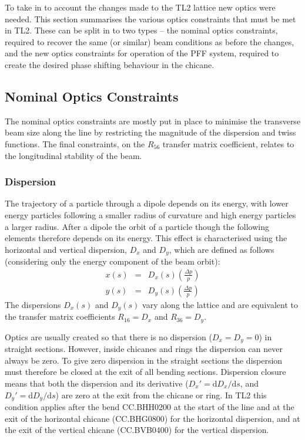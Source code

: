 To take in to account the changes made to the TL2 lattice new optics were needed. This section summarises the various optics constraints that must be met in TL2. These can be split in to two types -- the nominal optics constraints, required to recover the same (or similar) beam conditions as before the changes, and the new optics constraints for operation of the PFF system, required to create the desired phase shifting behaviour in the chicane.

\subsection{Nominal Optics Constraints}
\label{ss:nominalOpticsReqs}

The nominal optics constraints are mostly put in place to minimise the transverse beam size along the line by restricting the magnitude of the dispersion and twiss functions. The final constraints, on the \(R_{56}\) transfer matrix coefficient, relates to the longitudinal stability of the beam.

\subsubsection{Dispersion}

The trajectory of a particle through a dipole depends on its energy, with lower energy particles following a smaller radius of curvature and high energy particles a larger radius. After a dipole the orbit of a particle though the following elements therefore depends on its energy. This effect is characterised using the horizontal and vertical dispersion, \(D_x\) and \(D_y\), which are defined as follows (considering only the energy component of the beam orbit):
\begin{eqnarray}
x(s) &=& D_x(s)\left(\frac{\Delta p}{p}\right) \\
y(s) &=& D_y(s)\left(\frac{\Delta p}{p}\right)
\end{eqnarray}
The dispersions \(D_x(s)\) and \(D_y(s)\) vary along the lattice and are equivalent to the transfer matrix coefficients \(R_{16} = D_x\) and \(R_{36} = D_y\). 

Optics are usually created so that there is no dispersion (\(D_{x} = D_{y} = 0\)) in straight sections. However, inside chicanes and rings the dispersion can never always be zero. To give zero dispersion in the straight sections the dispersion must therefore be closed at the exit of all bending sections. Dispersion closure means that both the dispersion and its derivative (\(D_x' = \mathrm{d}D_x/\mathrm{d}s\), and \(D_y' = \mathrm{d}D_y/\mathrm{d}s\)) are zero at the exit from the chicane or ring. In TL2 this condition applies after the bend CC.BHH0200 at the start of the line and at the exit of the horizontal chicane (CC.BHG0800) for the horizontal dispersion, and at the exit of the vertical chicane (CC.BVB0400) for the vertical dispersion.

